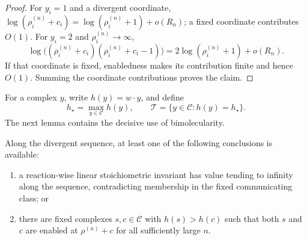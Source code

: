 \begin{proof}
For \(y_i=1\) and a divergent coordinate,
\(\log(\rho_i^{(n)}+c_i)=\log(\rho_i^{(n)}+1)+o(R_n)\); a fixed coordinate
contributes \(O(1)\).  For \(y_i=2\) and \(\rho_i^{(n)}\to\infty\),
\[
 \log\bigl((\rho_i^{(n)}+c_i)(\rho_i^{(n)}+c_i-1)\bigr)
 =2\log(\rho_i^{(n)}+1)+o(R_n).
\]
If that coordinate is fixed, enabledness makes its contribution finite and
hence \(O(1)\).  Summing the coordinate contributions proves the claim.
\end{proof}

For a complex \(y\), write \(h(y)=w\cdot y\), and define
\begin{equation}\label{eq:top}
  h_\star=\max_{y\in\mathcal C}h(y),
  \qquad
  \mathcal T=\{y\in\mathcal C:h(y)=h_\star\}.
\end{equation}
The next lemma contains the decisive use of bimolecularity.

\begin{lemma}\label{lem:top}
Along the divergent sequence, at least one of the following conclusions is
available:

\begin{enumerate}[label=\textup{(\roman*)},leftmargin=2.5em]
\item a reaction-wise linear stoichiometric invariant has value tending to
      infinity along the sequence, contradicting membership in the fixed
      communicating class; or
\item there are fixed complexes \(s,c\in\mathcal C\) with
      \(h(s)>h(c)\) such that both \(s\) and \(c\) are enabled at
      \(\rho^{(n)}+c\) for all sufficiently large \(n\).
\end{enumerate}
\end{lemma}

